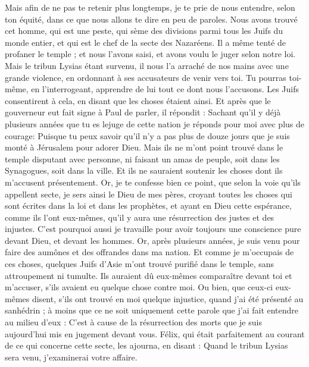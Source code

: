 \begin{multicols}{2}
Mais afin de ne pas te retenir plus longtemps, je te prie de nous entendre, selon ton équité, dans ce que nous allons te dire en peu de paroles.
Nous avons trouvé cet homme, qui est une peste, qui sème des divisions parmi tous les Juifs du monde entier, et qui est le chef de la secte des Nazaréens.
Il a même tenté de profaner le temple ; et nous l'avons saisi, et avons voulu le juger selon notre loi.
Mais le tribun Lysias étant survenu, il nous l'a arraché de nos mains avec une grande violence,
en ordonnant à ses accusateurs de venir vers toi. Tu pourras toi-même, en l'interrogeant, apprendre de lui tout ce dont nous l'accusons.
Les Juifs consentirent à cela, en disant que les choses étaient ainsi.
Et après que le gouverneur eut fait signe à Paul de parler, il répondit : Sachant qu'il y déjà plusieurs années que tu es lejuge de cette nation je réponds pour moi avec plus de courage:
Puisque tu peux savoir qu'il n'y a pas plus de douze jours que je suis monté à Jérusalem pour adorer Dieu.
Mais ils ne m'ont point trouvé dans le temple disputant avec personne, ni faisant un amas de peuple, soit dans les Synagogues, soit dans la ville. 
Et ils ne sauraient soutenir les choses dont ils m'accusent présentement.
Or, je te confesse bien ce point, que selon la voie qu'ils appellent secte, je sers ainsi le Dieu de mes pères, croyant toutes les choses qui sont écrites dans la loi et dans les prophètes,
et ayant en Dieu cette espérance, comme ils l’ont eux-mêmes, qu’il y aura une résurrection des justes et des injustes.
C'est pourquoi aussi je travaille pour avoir toujours une conscience pure devant Dieu, et devant les hommes.
Or, après plusieurs années, je suis venu pour faire des aumônes et des offrandes dans ma nation.
Et comme je m’occupais de ces choses, quelques Juifs d’Asie m’ont trouvé purifié dans le temple, sans attroupement ni tumulte.
Ils auraient dû eux-mêmes comparaître devant toi et m'accuser, s'ils avaient eu quelque chose contre moi.
Ou bien, que ceux-ci eux-mêmes disent, s'ils ont trouvé en moi quelque injustice, quand j'ai été présenté au sanhédrin ;
à moins que ce ne soit uniquement cette parole  que j’ai fait entendre au milieu d’eux : C’est à cause de la résurrection des morts que je suis aujourd’hui mis en jugement devant vous.
Félix, qui était parfaitement au courant de ce qui concerne cette secte, les ajourna, en disant : Quand le tribun Lysias sera venu, j’examinerai votre affaire.

\end{multicols}
